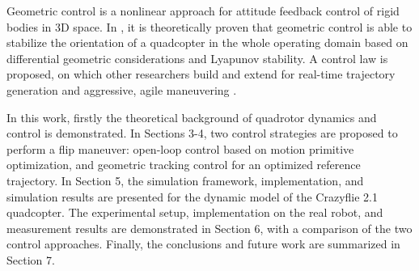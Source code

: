 Geometric control is a nonlinear approach for attitude feedback control of rigid bodies in 3D space. In \cite{lelemc2010}, it is theoretically proven that geometric control is able to stabilize the orientation of a quadcopter in the whole operating domain based on differential geometric considerations and Lyapunov stability. A control law is proposed, on which other researchers build and extend for real-time trajectory generation and aggressive, agile maneuvering \cite{turpinkumar2011, mellinger2011}.


In this work, firstly the theoretical background of quadrotor dynamics and control is demonstrated. In Sections 3-4, two control strategies are proposed to perform a flip maneuver:  open-loop control based on motion primitive optimization, and geometric tracking control for an optimized reference trajectory. In Section 5, the simulation framework, implementation, and simulation results are presented for the dynamic model of the Crazyflie 2.1 quadcopter. The experimental setup, implementation on the real robot, and  measurement results are demonstrated in Section 6, with a comparison of the two control approaches. Finally, the conclusions and future work are summarized in Section 7.
